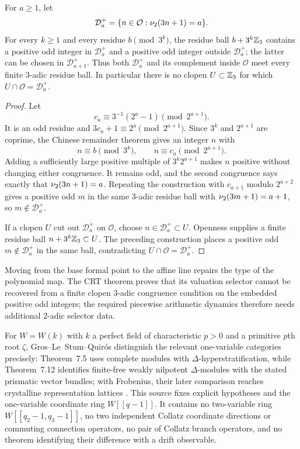 \begin{proposition}
\label{prop:symbolic-no-three-adic-valuation-selector}
For $a\geq1$, let
\[
 \mathcal D_a^+=\{n\in\mathcal O:\nu_{2}(3n+1)=a\}.
\]
For every $k\geq1$ and every residue $b\pmod{3^k}$, the residue ball
$b+3^k\mathbb{Z}_3$ contains a positive odd integer in $\mathcal D_a^+$ and a
positive odd integer outside $\mathcal D_a^+$; the latter can be chosen in
$\mathcal D_{a+1}^+$.  Thus both $\mathcal D_a^+$ and its complement inside
$\mathcal O$ meet every finite $3$-adic residue ball.  In particular there is
no clopen $U\subset\mathbb{Z}_3$ for which
$U\cap\mathcal O=\mathcal D_a^+$.
\end{proposition}

\begin{proof}
Let
\[
 c_a\equiv3^{-1}(2^a-1)\pmod{2^{a+1}}.
\]
It is an odd residue and
$3c_a+1\equiv2^a\pmod{2^{a+1}}$.  Since $3^k$ and $2^{a+1}$ are coprime, the
Chinese remainder theorem gives an integer $n$ with
\[
 n\equiv b\pmod{3^k},
 \qquad n\equiv c_a\pmod{2^{a+1}}.
\]
Adding a sufficiently large positive multiple of $3^k2^{a+1}$ makes $n$
positive without changing either congruence.  It remains odd, and the second
congruence says exactly that $\nu_{2}(3n+1)=a$.  Repeating the construction with
$c_{a+1}$ modulo $2^{a+2}$ gives a positive odd $m$ in the same $3$-adic
residue ball with $\nu_{2}(3m+1)=a+1$, so $m\notin\mathcal D_a^+$.

If a clopen $U$ cut out $\mathcal D_a^+$ on $\mathcal O$, choose
$n\in\mathcal D_a^+\subset U$.  Openness supplies a finite residue ball
$n+3^k\mathbb{Z}_3\subset U$.  The preceding construction places a positive odd
$m\notin\mathcal D_a^+$ in the same ball, contradicting
$U\cap\mathcal O=\mathcal D_a^+$.
\end{proof}

Moving from the base formal point to the affine line repairs the type of the
polynomial map.  The CRT theorem proves that its valuation selector cannot be
recovered from a finite clopen $3$-adic congruence condition on the embedded
positive odd integers; the required piecewise arithmetic dynamics therefore
needs additional $2$-adic selector data.

For $W=W(k)$ with $k$ a perfect field of characteristic $p>0$ and a primitive $p$th
root $\zeta$, Gros--Le~Stum--Quir\'os distinguish the relevant one-variable
categories precisely: Theorem~7.5 uses complete modules with
$\Delta$-hyperstratification, while Theorem~7.12 identifies finite-free
weakly nilpotent $\Delta$-modules with the stated prismatic vector bundles;
with Frobenius, their later comparison reaches crystalline representation
lattices \cite{GrosLeStumQuiros2025}.  This source fixes explicit hypotheses
and the one-variable coordinate ring $W[[q-1]]$.  It contains no two-variable
ring $W[[q_2-1,q_3-1]]$, no two independent Collatz coordinate directions or
commuting connection operators, no pair of Collatz branch operators, and no
theorem identifying their difference with a drift observable.


